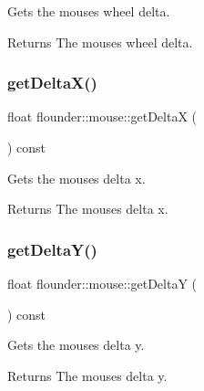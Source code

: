 Gets the mouses wheel delta. 

\begin{DoxyReturn}{Returns}
The mouses wheel delta. 
\end{DoxyReturn}
\mbox{\label{classflounder_1_1mouse_aafbbd955e1d66c0b4566f0806969bbf0}} 
\subsubsection{\texorpdfstring{get\+Delta\+X()}{getDeltaX()}}
{\footnotesize\ttfamily float flounder\+::mouse\+::get\+DeltaX (\begin{DoxyParamCaption}{ }\end{DoxyParamCaption}) const\hspace{0.3cm}{\ttfamily [inline]}}



Gets the mouses delta x. 

\begin{DoxyReturn}{Returns}
The mouses delta x. 
\end{DoxyReturn}
\mbox{\label{classflounder_1_1mouse_a083d7f7e024ed2cca257f353603180f6}} 
\subsubsection{\texorpdfstring{get\+Delta\+Y()}{getDeltaY()}}
{\footnotesize\ttfamily float flounder\+::mouse\+::get\+DeltaY (\begin{DoxyParamCaption}{ }\end{DoxyParamCaption}) const\hspace{0.3cm}{\ttfamily [inline]}}



Gets the mouses delta y. 

\begin{DoxyReturn}{Returns}
The mouses delta y. 
\end{DoxyReturn}
\mbox{\label{classflounder_1_1mouse_a08bea9df62055e5e810be78364dab057}} 

